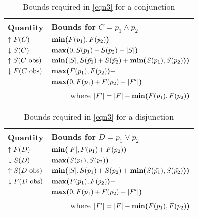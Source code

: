 \begin{table}
  \caption{Bounds required in \autoref{eqn3} for a conjunction}
  \label{tab:bounds-conj}
  \centering
  \begin{tabular}{ll}
    \toprule
    Quantity & Bounds for $C = p_1 \wedge p_2$ \\
    \midrule
    $\uparrow F(C) $
      &
      $\textbf{min(}F(p_1), F(p_2)\textbf{)}$
      \\
      
    $\downarrow S(C)$
      &
      $\textbf{max(}0, S(p_1) + S(p_2) - |S|\textbf{)}$
      \\
    
    $\uparrow S(\text{$C$ obs})$
      &
      $\textbf{min(}|S|, S(\text{$\bar{p_1}$}) + S(\text{$\bar{p_2}$}) + \textbf{min(}S(p_1), S(p_2)\textbf{)}\textbf{)}$
      \\
        
    $\downarrow F(\text{$C$ obs})$
      &
      $\textbf{max(}F(\text{$\bar{p_1}$}), F(\text{$\bar{p_2}$})\textbf{)} +$
      \\
      
      &
      $\textbf{max(}0, F(p_1) + F(p_2) - |F'|\textbf{)}$
      \\
      
      &
      \multicolumn{1}{r}{where $|F'| = |F| - \textbf{min(}F(\text{$\bar{p_1}$}), F(\text{$\bar{p_2}$})\textbf{)}$}
      \\
    \bottomrule
  \end{tabular}
\end{table}

\begin{table}
  \caption{Bounds required in \autoref{eqn3} for a disjunction}
  \label{tab:bounds-disj}
  \centering
  \begin{tabular}{ll}
    \toprule
    Quantity & Bounds for $D = p_1 \vee p_2$ \\
    \midrule
    $\uparrow F(D) $
      &
      $\textbf{min(}|F|, F(p_1) + F(p_2)\textbf{)}$
      \\
      
    $\downarrow S(D)$
      &
      $\textbf{max(}S(p_1), S(p_2)\textbf{)}$
      \\
      
    $\uparrow S(\text{$D$ obs})$
      &
      $\textbf{min(}|S|, S(p_1) + S(p_2) + \textbf{min(}S(\text{$\bar{p_1}$}), S(\text{$\bar{p_2}$})\textbf{)}\textbf{)}$
      \\
        
    $\downarrow F(\text{$D$ obs})$
      &
      $\textbf{max(}F(p_1), F(p_2)\textbf{)} +$
      \\
      
      &
      $\textbf{max(}0, F(\text{$\bar{p_1}$}) + F(\text{$\bar{p_2}$}) - |F'|\textbf{)}$
      \\
      
      &
      \multicolumn{1}{r}{where $|F'| = |F| - \textbf{min(}F(p_1), F(p_2)\textbf{)}$}
      \\
    \bottomrule
  \end{tabular}
\end{table}

